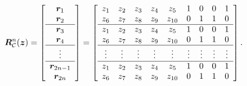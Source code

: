 \documentclass[10pt,a4paper]{article}
\begin{document}
\begin{equation}
\bm{R}_\mathcal{C}^n(\bm{z})
=
\left[
\begin{array}{c}
\bm{r}_1 \\
\bm{r}_2 \\
\hline
\bm{r}_3 \\
\bm{r}_4 \\
\hline
\vdots \\
\hline
\bm{r}_{2n-1} \\
\bm{r}_{2n} \\
\end{array}
\right]
=
\left[
\begin{array}{ccccc cccc}
z_1&z_2&z_3&z_4&z_5&1&0&0&1 \\
z_6&z_7&z_8&z_9&z_{10}&0&1&1&0 \\ 
\hline
z_1&z_2&z_3&z_4&z_5&1&0&0&1 \\
z_6&z_7&z_8&z_9&z_{10}&0&1&1&0 \\ 
\hline
\vdots&\vdots&\vdots&\vdots&\vdots&\vdots&\vdots&\vdots&\vdots \\
\hline
z_1&z_2&z_3&z_4&z_5&1&0&0&1 \\
z_6&z_7&z_8&z_9&z_{10}&0&1&1&0 \\ 
\end{array}
\right] .
\label{eq:gait_ptrn_curve}
\end{equation}
\end{document}

